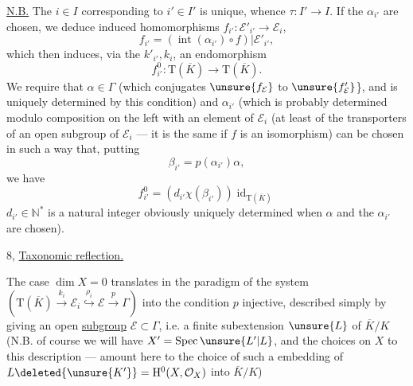 \uline{N.B.} The $i\in I$ corresponding to $i'\in I'$ is unique, whence $\tau:I'\longrightarrow I$.
If the $\alpha_{i'}$ are chosen, we deduce  induced homomorphisms
$f_{i'}:\mathcal E'_{i'}\longrightarrow\mathcal E_i$,
\[
f_{i'}=(\operatorname{int}(\alpha_{i'})\circ f)|\mathcal E'_{i'},
\]
which then induces, via the $k'_{i'},k_i$, an endomorphism
\[
f^0_{i'}:\mathrm T(\overline K)\longrightarrow\mathrm T(\overline K).
\]
We require that $\alpha\in\Gamma$ (which conjugates $\unsure{f_{\mathcal E}}$ to $\unsure{f'_{\mathcal E}}$\}, and is  uniquely determined by this condition) and $\alpha_{i'}$ (which is probably determined modulo  composition on the left with an element  of $\mathcal E_i$ (at least of the transporters  of an open subgroup of $\mathcal E_i$ --- it is the same if $f$ is an isomorphism) can be chosen in such a way that, putting
\[
\beta_{i'}=p(\alpha_{i'})\alpha,
\]
we have
\[
f^0_{i'}=(d_{i'}\chi(\beta_{i'}))\operatorname{id}_{\mathrm T(\overline K)}
\]
$d_{i'}\in\mathbb N^*$ is a natural integer obviously uniquely determined \unsure{\}} when $\alpha$ and the $\alpha_{i'}$ are chosen).


8, \uline{Taxonomic reflection.}

The case $\dim X=0$ translates in the paradigm of the system
$(\mathrm T(\overline K)\xrightarrow{k_i}\mathcal E_i\overset{\rho_i}{\hookrightarrow}\mathcal E\xrightarrow{p}\Gamma)$
 into the condition  $p$ injective, 
described 
simply by giving an open \uline{subgroup} $\mathcal E\subset\Gamma$, i.e. a finite subextension $\unsure{L}$ of $\overline K/K$
(N.B. of course we will have $X'=\operatorname{Spec}\unsure{L'|L}$, and the choices  on $X$   to this description --- amount here to the choice of such a embedding of $L\deleted{\unsure{K'}}=\mathrm H^0(X,\mathcal O_X)$ into $\overline K/K$)

